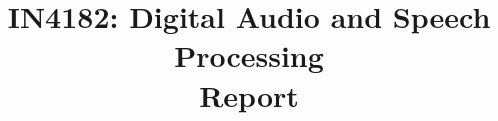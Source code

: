 \documentclass[conference]{IEEEtran}
\begin{document}
\title{IN4182: Digital Audio and Speech Processing\\
    \large Report}
\author{
  \and
}
\maketitle



 \clearpage
 \clearpage
 \clearpage
 \clearpage
 \clearpage
 \clearpage
 \clearpage


\nocite{*}




\end{document}
